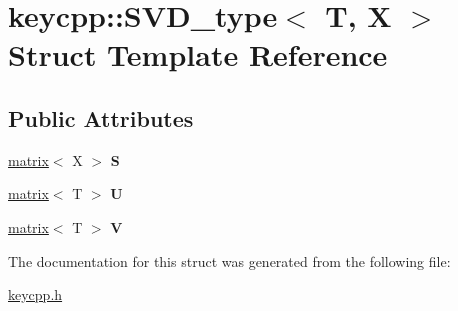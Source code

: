 \hypertarget{structkeycpp_1_1_s_v_d__type}{\section{keycpp\-:\-:S\-V\-D\-\_\-type$<$ T, X $>$ Struct Template Reference}
\label{structkeycpp_1_1_s_v_d__type}
}
\subsection*{Public Attributes}
\begin{DoxyCompactItemize}
\item 
\hypertarget{structkeycpp_1_1_s_v_d__type_afcf98e82919e015758d99cee5adb65bf}{\hyperlink{classkeycpp_1_1matrix}{matrix}$<$ X $>$ {\bfseries S}}\label{structkeycpp_1_1_s_v_d__type_afcf98e82919e015758d99cee5adb65bf}

\item 
\hypertarget{structkeycpp_1_1_s_v_d__type_a31194fbf88ec1fb87f2681d0f518761d}{\hyperlink{classkeycpp_1_1matrix}{matrix}$<$ T $>$ {\bfseries U}}\label{structkeycpp_1_1_s_v_d__type_a31194fbf88ec1fb87f2681d0f518761d}

\item 
\hypertarget{structkeycpp_1_1_s_v_d__type_ad0a6e396e2548ab4762a5676ae88e4bd}{\hyperlink{classkeycpp_1_1matrix}{matrix}$<$ T $>$ {\bfseries V}}\label{structkeycpp_1_1_s_v_d__type_ad0a6e396e2548ab4762a5676ae88e4bd}

\end{DoxyCompactItemize}


The documentation for this struct was generated from the following file\-:\begin{DoxyCompactItemize}
\item 
\hyperlink{keycpp_8h}{keycpp.\-h}\end{DoxyCompactItemize}
